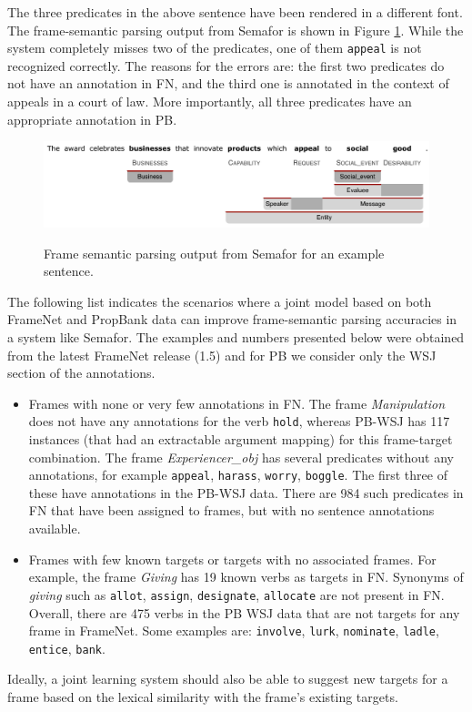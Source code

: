 \documentclass[11pt]{article}
\begin{document}
The three predicates in the above sentence have been rendered in a different font. The frame-semantic parsing output from Semafor is shown in Figure \ref{fig:semaforOutput}. While the system completely misses two of the predicates, one of them \texttt{appeal} is not recognized correctly. The reasons for the errors are: the first two predicates do not have an annotation in FN, and the third one is annotated in the context of appeals in a court of law. More importantly, all three predicates have an appropriate annotation in PB.

\begin{figure}
\caption{Frame semantic parsing output from Semafor for an example sentence.}
\includegraphics[scale=0.4]{semafor_output.jpg}
\label{fig:semaforOutput}
\end{figure}


The following list indicates the scenarios where a joint model based on both FrameNet and PropBank data can improve frame-semantic parsing accuracies in a system like Semafor. The examples and numbers presented below were obtained from the latest FrameNet release (1.5) and for PB we consider only the WSJ section of the annotations.
\begin{itemize}
\item Frames with none or very few annotations in FN. The frame \textit{Manipulation} does not have any annotations for the verb \texttt{hold}, whereas PB-WSJ has 117 instances (that had an extractable argument mapping) for this frame-target combination. The frame \textit{Experiencer\_obj} has several predicates without any annotations, for example \texttt{appeal}, \texttt{harass}, \texttt{worry}, \texttt{boggle}. The first three of these have annotations in the PB-WSJ data. There are 984 such predicates in FN that have been assigned to frames, but with no sentence annotations available.
\item Frames with few known targets or targets with no associated frames. For example, the frame \textit{Giving} has 19 known verbs as targets in FN. Synonyms of \textit{giving} such as \texttt{allot}, \texttt{assign}, \texttt{designate}, \texttt{allocate} are not present in FN. Overall, there are 475 verbs in the PB WSJ data that are not targets for any frame in FrameNet. Some examples are: \texttt{involve}, \texttt{lurk}, \texttt{nominate}, \texttt{ladle}, \texttt{entice}, \texttt{bank}.
\end{itemize}
Ideally, a joint learning system should also be able to suggest new targets for a frame based on the lexical similarity with the frame's existing targets.
\end{document}

